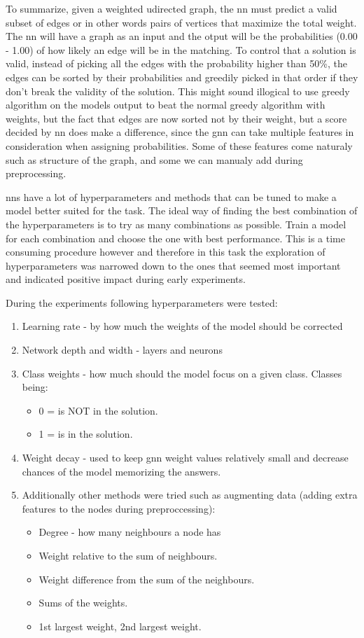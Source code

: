 To summarize, given a weighted udirected graph, the \gls{nn} must predict  a valid subset of edges or in other words pairs of vertices that maximize the total weight. The \gls{nn} will have a graph as an input and the otput will be the probabilities (0.00 - 1.00) of how likely an edge will be in the matching. To control that a solution is valid, instead of picking all the edges with the probability higher than 50\%, the edges can be sorted by their probabilities and greedily picked in that order if they don't break the validity of the solution. This might sound illogical to use greedy algorithm on the models output to beat the normal greedy algorithm with weights, but the fact that edges are now sorted not by their weight, but a score decided by \gls{nn} does make a difference, since the \gls{gnn} can take multiple features in consideration when assigning probabilities. Some of these features come naturaly such as structure of the graph, and some we can manualy add during preprocessing. 

\gls{nn}s have a lot of hyperparameters and methods that can be tuned to make a model better suited for the task. The ideal way of finding the best combination of the hyperparameters is to try as many combinations as possible. Train a model for each combination and choose the one with best performance. This is a time consuming procedure however and therefore in this task the exploration of hyperparameters was narrowed down to the ones that seemed most important and indicated positive impact during early experiments. 

During the experiments following hyperparameters were tested:
\begin{enumerate}
\item Learning rate - by how much the weights of the model should be corrected
\item Network depth and width - layers and neurons
\item Class weights - how much should the model focus on a given class. Classes being: 
	\begin{itemize}
	\item 0 = is NOT in the solution.
	\item 1 = is in the solution.
	\end{itemize}	
\item Weight decay - used to keep \gls{gnn} weight values relatively small and decrease chances of the model memorizing the answers. 

\item Additionally other methods were tried such as augmenting data (adding extra features to the nodes during preproccessing): 
	\begin{itemize}
	\item Degree - how many neighbours a node has
	\item Weight relative to the sum of neighbours.
	\item Weight difference from the sum of the neighbours.
	\item Sums of the weights. 
	\item 1st largest weight, 2nd largest weight.
	\end{itemize}

\end{enumerate}

